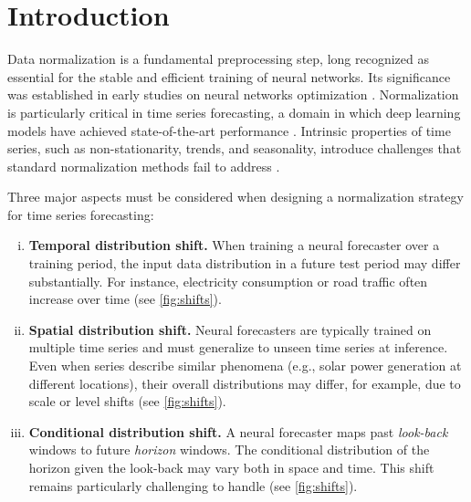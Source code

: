 \section{Introduction} \label{intro}

Data normalization is a fundamental preprocessing step, long recognized as essential for the stable and efficient training of neural networks. Its significance was established in early studies on neural networks optimization \citep{DBLP:series/lncs/LeCunBOM12}.
Normalization is particularly critical in time series forecasting, a domain in which deep learning models have achieved state-of-the-art performance \citep{patchtst}. Intrinsic properties of time series, such as non-stationarity, trends, and seasonality, introduce challenges that standard normalization methods fail to address \citep{adaptivenorm}.

Three major aspects must be considered when designing a normalization strategy for time series forecasting:

\begin{enumerate}[(i)]
    \item \textbf{Temporal distribution shift.} When training a neural forecaster over a training period, the input data distribution in a future test period may differ substantially. For instance, electricity consumption or road traffic often increase over time (see \cref{fig:shifts}).

    \item \textbf{Spatial distribution shift.} Neural forecasters are typically trained on multiple time series and must generalize to unseen time series at inference. Even when series describe similar phenomena (e.g., solar power generation at different locations), their overall distributions may differ, for example, due to scale or level shifts (see \cref{fig:shifts}).

    \item \textbf{Conditional distribution shift.} A neural forecaster maps past \textit{look-back} windows to future \textit{horizon} windows. The conditional distribution of the horizon given the look-back may vary both in space and time. This shift remains particularly challenging to handle (see \cref{fig:shifts}).
\end{enumerate}



